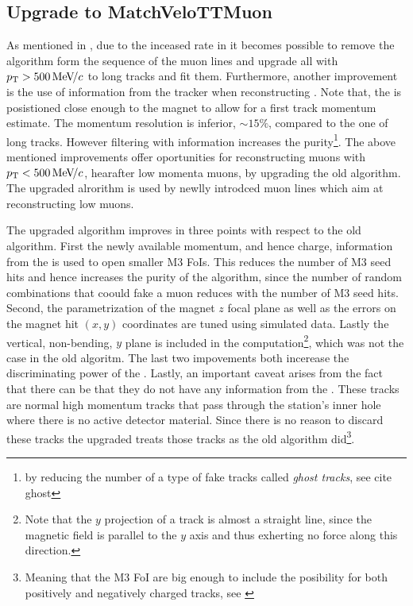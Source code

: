 
\subsection{Upgrade to MatchVeloTTMuon}
\label{sec:matchvelottmuon}
As mentioned in , due to the inceased \hltone rate in \runtwo it becomes possible to
remove the \mvm algorithm form the sequence of the \hltone muon lines and upgrade all \veloTracks with $\mbox{$p_{\rm T}$}>500 {\mathrm{\,Me\kern -0.1em V\!/}c}$ to long tracks and fit them.
Furthermore, another improvement is the use of information from the \ttracker tracker when reconstructing \veloTracks \cite{LHCb-PUB-2015-005}.
Note that, the \ttracker is posistioned close enough to the \lhcb magnet to allow for a first track momentum estimate.
The \ttracker momentum resolution is inferior, $\sim 15\%$, compared to the one of long tracks. However filtering
\veloTracks with \ttracker information increases the purity\footnote{by reducing the number of a type of fake tracks called {\it ghost tracks}, see {\color{red} cite ghost}}.
The above mentioned improvements offer oportunities for reconstructing muons with $\mbox{$p_{\rm T}$}<500 {\mathrm{\,Me\kern -0.1em V\!/}c}$, hearafter low momenta muons,
by upgrading the old \mvm algorithm. The upgraded alrorithm is used by newlly introdced \hltone muon lines which aim
at reconstructing low \pt muons.

The upgraded \mvTTm algorithm improves in three points with respect to the old \mvm algorithm.
First the newly available momentum, and hence charge, information from the \ttracker is used to open smaller M3 FoIs.
This reduces the number of M3 seed hits and hence increases the purity of the \mvTTm algorithm, since the number of
random combinations that coould fake a muon reduces with the number of M3 seed hits.
Second, the parametrization of the magnet $z$ focal plane as well as the errors on the magnet hit $(x,y)$ coordinates
are tuned using simulated data. Lastly the vertical, non-bending, $y$ plane is included in the \chisq
computation\footnote{Note that the $y$ projection of a track is almost a straight line, since the magnetic field is parallel to the $y$ axis
and thus exherting no force along this direction.}, which was not the case in the old \mvm algoritm.
The last two impovements both incerease the discriminating power of the \chisq.
Lastly, an important caveat arises from the fact that there can be \veloTTracks that they do not have any information from
the \ttracker. These tracks are normal high momentum tracks that pass through the \ttracker station's inner hole
where there is no active detector material. Since there is no reason to discard these tracks the upgraded \mvTTm treats
those tracks as the old \mvm algorithm did\footnote{Meaning that the M3 FoI are big enough to include the posibility for
both positively and negatively charged tracks, see \cite{roelThesis}}.

